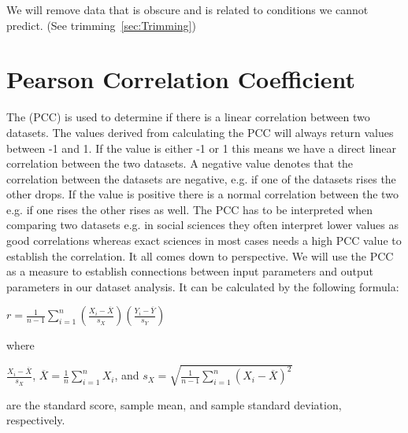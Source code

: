 We will remove data that is obscure and is related to conditions we cannot predict. (See trimming~\ref{sec:Trimming})

\newpage
\section{Pearson Correlation Coefficient}
\label{sec:Pearsons}
The (PCC) is used to determine if there is a linear correlation between two datasets. The values derived from calculating the PCC will always return values between -1 and 1. If the value is either -1 or 1 this means we have a direct linear correlation between the two datasets. A negative value denotes that the correlation between the datasets are negative, e.g. if one of the datasets rises the other drops. If the value is positive there is a normal correlation between the two e.g. if one rises the other rises as well. The PCC has to be interpreted when comparing two datasets e.g. in social sciences they often interpret lower values as good correlations whereas exact sciences in most cases needs a high PCC value to establish the correlation. It all comes down to perspective. We will use the PCC as a measure to establish connections between input parameters and output parameters in our dataset analysis. It can be calculated by the following formula:

\begin{center}
$ r = \frac{1}{n-1}\sum_{i=1}^{n}(\frac{X_i-\overline{X}}{s_X})(\frac{Y_i-\overline{Y}}{s_Y})$
\end{center}

\noindent where 

\begin{center}
$ \frac{X_i-\overline{X}}{s_X}$,   $\overline{X} = \frac{1}{n}\sum_{i=1}^{n}X_i$,   and $s_X = \sqrt{\frac{1}{n-1}\sum_{i=1}^{n}(X_i-\overline{X})^2}$
\end{center}

\noindent are the standard score, sample mean, and sample standard deviation, respectively.